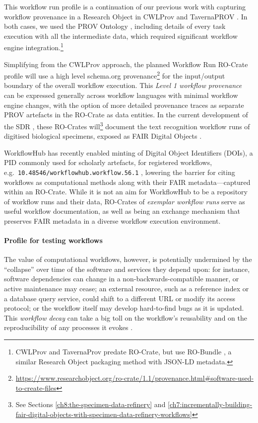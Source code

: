 This workflow run profile is a continuation of our previous work with
capturing workflow provenance in a Research Object in CWLProv
\cite{Khan 2019} and
TavernaPROV \cite{Soiland-Reyes 2016}.
In both cases, we used the PROV Ontology
\cite{Lebo 2013a},
including details of every task execution with all the intermediate
data, which required significant workflow engine integration.\footnote{CWLProv
  and TavernaProv predate RO-Crate, but use RO-Bundle
  \cite{Soiland-Reyes 2014}, a similar
  Research Object packaging method with JSON-LD metadata.}

Simplifying from the CWLProv approach, the planned Workflow Run RO-Crate
profile will use a high level schema.org
provenance\footnote{\url{https://www.researchobject.org/ro-crate/1.1/provenance.html\#software-used-to-create-files}}
for the input/output boundary of the overall workflow
execution. This \emph{Level 1 workflow provenance}
\cite{Khan 2019} can be
expressed generally across workflow languages with minimal workflow
engine changes, with the option of more detailed provenance traces as
separate PROV artefacts in the RO-Crate as data entities. In the current
development of the
\acrlong{SDR}
 \cite{Walton 2020a}, these
RO-Crates will\footnote{See Sections \vref{ch8:the-specimen-data-refinery} and \vref{ch7:incrementally-building-fair-digital-objects-with-specimen-data-refinery-workflows}} document the text recognition workflow runs of digitised
biological specimens, exposed as FAIR Digital Objects
\cite{De Smedt 2020}.

WorkflowHub has recently enabled minting of Digital Object Identifiers
(DOIs), a PID commonly used for scholarly artefacts, for registered
workflows, e.g.~\texttt{10.48546/workflowhub.workflow.56.1}
\cite{Lowe 2021b},
lowering the barrier for citing workflows as computational methods along
with their FAIR metadata---captured within an RO-Crate. While it is not
an aim for WorkflowHub to be a repository of workflow runs and their
data, RO-Crates of \emph{exemplar workflow runs} serve as useful
workflow documentation, as well as being an exchange mechanism that
preserves FAIR metadata in a diverse workflow execution environment.

\paragraph{Profile for testing workflows}\label{ch5:profile-for-testing-workflows}

The value of computational workflows, however, is potentially undermined
by the ``collapse'' over time of the software and services they depend
upon: for instance, software dependencies can change in a
non-backwards-compatible manner, or active maintenance may cease; an
external resource, such as a reference index or a database query
service, could shift to a different URL or modify its access protocol;
or the workflow itself may develop hard-to-find bugs as it is updated.
This \emph{workflow decay} can take a big toll on the workflow's
reusability and on the reproducibility of any processes it evokes
\cite{Zhao 2012}.

